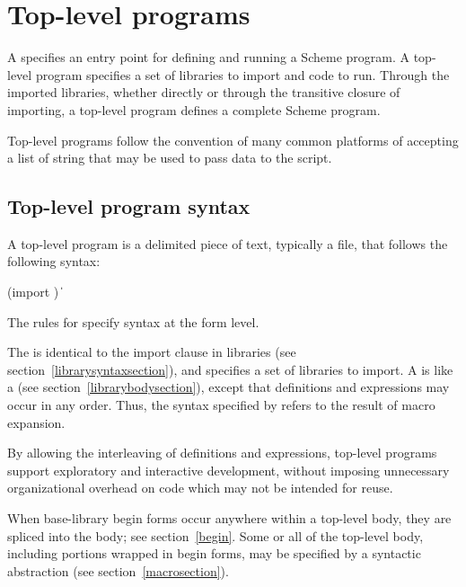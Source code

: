 \chapter{Top-level programs}
\label{programchapter}

A  specifies an entry point for defining and running
a Scheme program.  A top-level program specifies a set of libraries to import and
code to run.  Through the imported libraries, whether directly or through the
transitive closure of importing, a top-level program defines a complete Scheme
program.

Top-level programs follow the convention of many common platforms of accepting 
a list of string  that may be used to
pass data to the script.

\section{Top-level program syntax}

A top-level program is a delimited piece of text, typically a file, that follows
the following syntax:
%
\begin{grammar}
 \:  
 \: (import )
 \: 
 \:  \| 
\end{grammar}
%
The rules for  specify syntax at the form level.

The  is identical to the import clause in
libraries (see section~\ref{librarysyntaxsection}), 
and specifies a set of libraries to import.  A  is like a  (see
section~\ref{librarybodysection}), except that 
definitions and expressions may occur in any order.  Thus, the syntax
specified by  refers to the result of macro
expansion.

\begin{rationale}
By allowing the interleaving of definitions and expressions, top-level 
programs support exploratory and interactive development, without 
imposing unnecessary organizational overhead on code which may not be 
intended for reuse.
\end{rationale}

When base-library {\cf begin} forms occur anywhere within a top-level body,
they are spliced into the body; see section~\ref{begin}.
Some or all of the top-level body, including portions wrapped in {\cf begin}
forms, may be specified by a syntactic abstraction
(see section~\ref{macrosection}).

